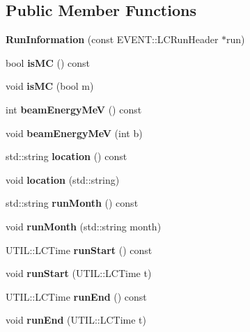 \subsection*{Public Member Functions}
\begin{DoxyCompactItemize}
\item 
{\bfseries RunInformation} (const EVENT::LCRunHeader $\ast$run)\label{classRunInformation_a03368256e5d800b58b63d82300a70f74}

\item 
bool {\bfseries isMC} () const \label{classRunInformation_abcb9533465cb06b0b38a1f586da3b4c6}

\item 
void {\bfseries isMC} (bool m)\label{classRunInformation_a1a244eb9e74b9aa7238218fc13b5bfaa}

\item 
int {\bfseries beamEnergyMeV} () const \label{classRunInformation_a77e4bfff69ddd5fd39b9e2aa1f9864a4}

\item 
void {\bfseries beamEnergyMeV} (int b)\label{classRunInformation_a55ee38b3ff72be26ad066847c31eee94}

\item 
std::string {\bfseries location} () const \label{classRunInformation_ad16df67de202576fb965305a32a0127a}

\item 
void {\bfseries location} (std::string)\label{classRunInformation_a77e67b37e35ecdda241305347d1ca267}

\item 
std::string {\bfseries runMonth} () const \label{classRunInformation_a106a787de2ea90af01adc7d18ada359a}

\item 
void {\bfseries runMonth} (std::string month)\label{classRunInformation_ad7fb33e94ebc671255a2263e13e18564}

\item 
UTIL::LCTime {\bfseries runStart} () const \label{classRunInformation_a92794be1db82086ba339271c4e5d9ea0}

\item 
void {\bfseries runStart} (UTIL::LCTime t)\label{classRunInformation_ab5035e9e7619a0bf5efd4bf99760bd80}

\item 
UTIL::LCTime {\bfseries runEnd} () const \label{classRunInformation_a178fffe32671265948cb8982f661f3d6}

\item 
void {\bfseries runEnd} (UTIL::LCTime t)\label{classRunInformation_ad5338dceec438281d98866a6416e148d}


\end{DoxyCompactItemize}
